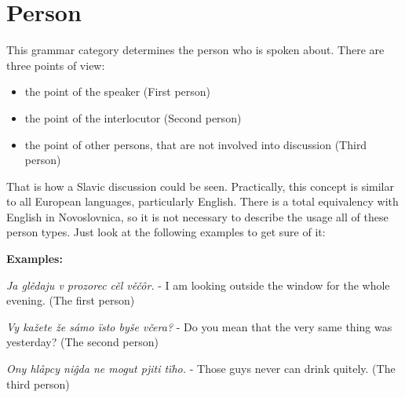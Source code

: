 \section{Person}

This grammar category determines the person who is spoken about. There are three points of view:

\begin{itemize}
	\item the point of the speaker (First person)
	\item the point of the interlocutor (Second person)
	\item the point of other persons, that are not involved into discussion (Third person)
\end{itemize}

That is how a Slavic discussion could be seen. Practically, this concept is similar to all European languages, particularly English. There is a total equivalency with English in Novoslovnica, so it is not necessary to describe the usage all of these person types. Just look at the following examples to get sure of it:

\textbf{Examples:}

\textit{Ja glědaju v prozorec cěl věčôr.} - I am looking outside the window for the whole evening. (The first person)

\textit{Vy kažete že sámo ïsto byše včera? }- Do you mean that the very same thing was yesterday? (The second person)

\textit{Ony hlåpcy niĝda ne mogut pjiti tïho.} - Those guys never can drink quitely. (The third person)

